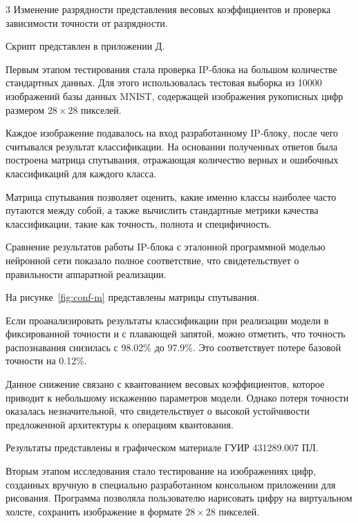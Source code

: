     3 Изменение разрядности представления весовых коэффициентов и проверка 
    зависимости точности от разрядности.

    Скрипт представлен в приложении Д.

\anonsection{}Первым этапом тестирования стала проверка IP-блока на большом 
количестве стандартных данных. Для этого использовалась тестовая выборка из 
10000 изображений базы данных MNIST, содержащей изображения рукописных цифр 
размером $28\times28$ пикселей.

Каждое изображение подавалось на вход разработанному IP-блоку, после чего 
считывался результат классификации. На основании полученных ответов была 
построена матрица спутывания, отражающая количество верных и ошибочных 
классификаций для каждого класса.

Матрица спутывания позволяет оценить, какие именно классы наиболее часто 
путаются между собой, а также вычислить стандартные метрики качества 
классификации, такие как точность, полнота и 
специфичность.

Сравнение результатов работы IP-блока с эталонной программной моделью нейронной 
сети показало полное соответствие, что свидетельствует о правильности 
аппаратной реализации.

На рисунке~\ref{fig:conf-m} представлены матрицы спутывания.


Если проанализировать результаты классификации при реализации модели в 
фиксированной точности и с плавающей запятой, можно отметить, что точность 
распознавания снизилась с 98.02\% до 97.9\%. Это соответствует потере базовой 
точности на 0.12\%.

Данное снижение связано с квантованием весовых коэффициентов, которое приводит 
к небольшому искажению параметров модели. Однако потеря точности оказалась 
незначительной, что свидетельствует о высокой устойчивости предложенной 
архитектуры к операциям квантования.

Результаты представлены в графическом материале ГУИР 431289.007 ПЛ.

\anonsection{}Вторым этапом исследования стало тестирование на изображениях 
цифр, созданных вручную в специально разработанном консольном приложении для 
рисования. Программа позволяла пользователю нарисовать цифру на виртуальном 
холсте, сохранить изображение в формате $28\times28$ пикселей.


